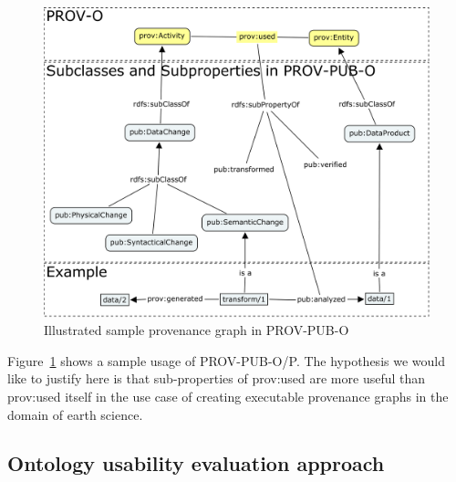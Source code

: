 \begin{figure}
	\includegraphics[width=\textwidth]{prov-pub-o.png}
	\caption{Illustrated sample provenance graph in PROV-PUB-O}
	\label{fig:prov-pub-o-eg}
\end{figure}

Figure~\ref{fig:prov-pub-o-eg} shows a sample usage of PROV-PUB-O/P.
The hypothesis we would like to justify here is that sub-properties of prov:used are more useful than prov:used itself in the use case of creating executable provenance graphs in the domain of earth science.




\subsection{Ontology usability evaluation approach}
\label{subsec:evaluation}

